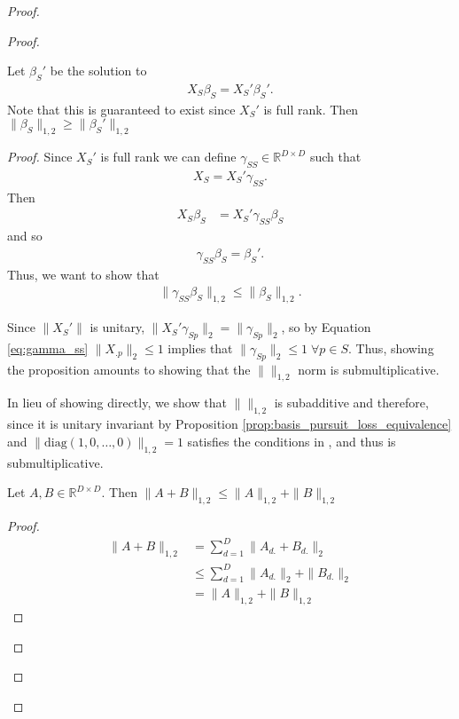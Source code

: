 \begin{proof}
\begin{proof}
\begin{proposition}
Let $\beta_S'$ be the solution to
\begin{align}
X_S \beta_S = X_S' \beta_S'.
\end{align}
Note that this is guaranteed to exist since $X_S'$ is full rank.  
Then $\|\beta_S\|_{1,2} \geq \|\beta_S'\|_{1,2}$
\end{proposition}
\begin{proof}
Since $X_S'$ is full rank we can define $\gamma_{SS} \in \mathbb R^{D \times D}$ such that 
\begin{align}
\label{eq:gamma_ss}
X_S  = X_S' \gamma_{SS}.
\end{align}
Then 
\begin{align}
X_S \beta_S &= X_S' \gamma_{SS} \beta_S
\end{align}
and so
\begin{align}
\gamma_{SS} \beta_S = \beta_S'.
\end{align}
Thus, we want to show that 
\begin{align}
\| \gamma_{SS} \beta_S  \|_{1,2} \leq \|\beta_S\|_{1,2}.
\end{align}

Since $\|X_S'\|$ is unitary, $\|X_S' \gamma_{Sp}\|_2 = \| \gamma_{Sp}\|_2$, so by Equation \ref{eq:gamma_ss} $\|X_{.p}\|_2 \leq 1$ implies that $\|\gamma_{Sp}\|_2 \leq 1 \; \forall  p \in S$.
Thus, showing the proposition amounts to showing that the $\|\|_{1,2}$ norm is submultiplicative.

In lieu of showing directly, we show that $\|\|_{1,2}$ is subadditive and therefore, since it is unitary invariant by Proposition \ref{prop:basis_pursuit_loss_equivalence} and $\|\text{diag}(1, 0, \dotsc, 0)\|_{1,2} =1$ satisfies the conditions in \cite{HIAI2004155}, and thus is submultiplicative.

\begin{proposition}
\label{prop:subadditivity}
Let $A, B \in \mathbb R^{D \times D}$.  Then $\|A + B \|_{1,2} \leq \|A  \|_{1,2}  +  \|B \|_{1,2} $
\end{proposition}
\begin{proof}
\begin{align}
\|A + B \|_{1,2} &= \sum_{d = 1}^D \|A_{d.} + B_{d.}\|_2 \\
&\leq \sum_{d = 1}^D \|A_{d.}\|_2 + \|B_{d.}\|_2 \\
&= \|A  \|_{1,2}  +  \|B \|_{1,2} 
\end{align}
\end{proof}


\end{proof}
\end{proof}
\end{proof}
